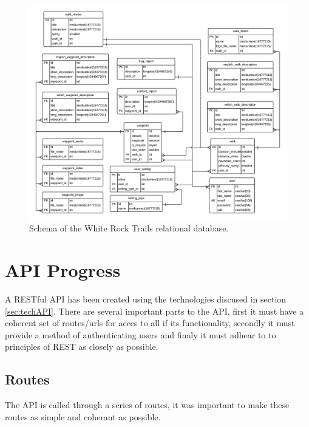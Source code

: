 \documentclass[11pt,a4paper]{article}
\begin{document}
\begin{figure}[H]
\centering
\includegraphics[angle=90, width=1\linewidth]{./img/DatabaseSchema}
\caption{Schema of the White Rock Trails relational database.}
\label{fig:DatabaseSchema}
\end{figure}

\section{API Progress}

A RESTful API has been created using the technologies discused in section \ref{sec:techAPI}. There are several important parts to the API, first it must have a coherent set of routes/urls for acces to all if its functionality, secondly it must provide a method of authenticating users and finaly it must adhear to to principles of REST as closely as possible. 

\subsection{Routes}

The API is called through a series of routes, it was important to make these routes as simple and coherant as possible.
\end{document}
